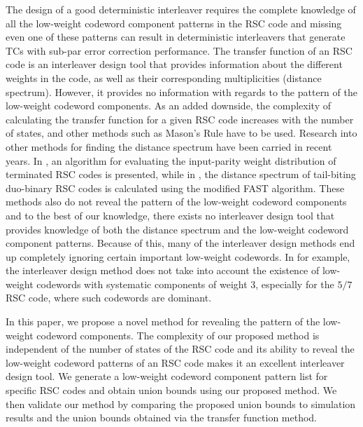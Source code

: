 The design of a good deterministic interleaver requires the complete knowledge of all the low-weight codeword component patterns in the RSC code and missing even one of these patterns can result in deterministic interleavers that generate TCs with sub-par error correction performance.
The transfer function of an RSC code is an interleaver design tool that provides information about the different weights in the code, as well as their corresponding multiplicities (distance spectrum). 
However, it provides no information with regards to the pattern of the low-weight codeword components. As an added downside, the complexity of calculating the transfer function for a given RSC code increases with the number of states, and other methods such as Mason's Rule \cite{ref3} have to be used. Research into other methods for finding the distance spectrum have been carried in recent years.  In \cite{ref8}, an algorithm for evaluating the input-parity weight distribution of
terminated RSC codes is presented, while in \cite{ref9}, the distance spectrum of tail-biting duo-binary
RSC codes is calculated using the modified FAST algorithm. These methods also do not reveal the pattern of the low-weight codeword components and to the best of our knowledge, there exists no interleaver design tool that provides knowledge of both the distance spectrum and the low-weight codeword component patterns. Because of this, many of the interleaver design methods end up completely ignoring certain important low-weight codewords. In \cite{ref5} for example, the interleaver design method does not take into account the existence of low-weight codewords with systematic components of weight 3, especially for the $5/7$  RSC code, where such codewords are dominant.

In this paper, we propose a novel method for revealing the pattern of the low-weight codeword components. The complexity of our proposed method is independent of the number of states of the RSC code and its ability to reveal the low-weight codeword patterns of an RSC code makes it an excellent interleaver design tool.
We generate a low-weight codeword component pattern list for specific RSC codes and obtain union bounds using our proposed method. We then validate our method by comparing the proposed union bounds to simulation results and the union bounds obtained via the transfer function method.

